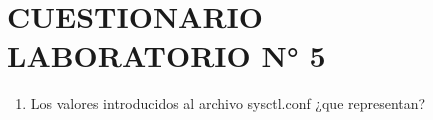 \section{CUESTIONARIO LABORATORIO  N° 5} 

\begin{enumerate}[1.]
	\item  Los valores introducidos al archivo sysctl.conf ¿que representan?\\ 




\end{enumerate} 